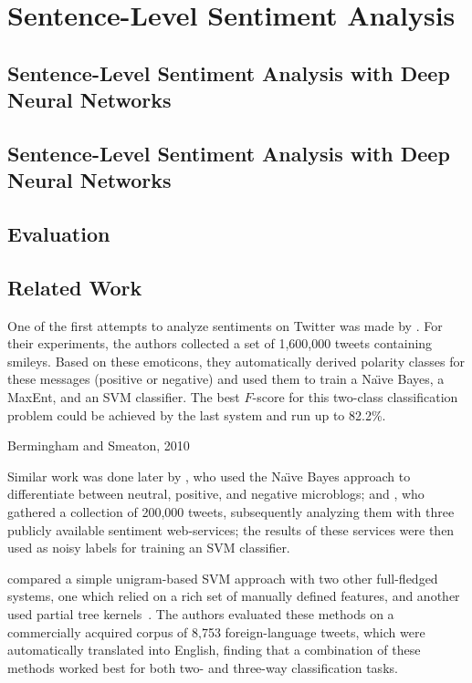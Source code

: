 \section{Sentence-Level Sentiment Analysis}\label{sec:snt:slsa}



\subsection{Sentence-Level Sentiment Analysis with Deep Neural Networks}

\subsection{Sentence-Level Sentiment Analysis with Deep Neural Networks}

\subsection{Evaluation}

\subsection{Related Work}

\citet{Hu:04}

\citet{Kim:04}

One of the first attempts to analyze sentiments on Twitter was made by
\citet{Go:09}.  For their experiments, the authors collected a set of
1,600,000 tweets containing smileys.  Based on these emoticons, they
automatically derived polarity classes for these messages (positive or
negative) and used them to train a Na\"{\i}ve Bayes, a MaxEnt, and an
SVM classifier.  The best $F$-score for this two-class classification
problem could be achieved by the last system and run up to 82.2\%.

Bermingham and Smeaton, 2010

Similar work was done later by \citet{Pak:10}, who used the Na\"{\i}ve
Bayes approach to differentiate between neutral, positive, and
negative microblogs; and \citet{Barbosa:10}, who gathered a collection
of 200,000 tweets, subsequently analyzing them with three publicly
available sentiment web-services; the results of these services were
then used as noisy labels for training an SVM classifier.

\citet{Agarwal:11} compared a simple unigram-based SVM approach with
two other full-fledged systems, one which relied on a rich set of
manually defined features, and another used partial tree
kernels~\cite{Moschitti:06}.  The authors evaluated these methods on a
commercially acquired corpus of 8,753 foreign-language tweets, which
were automatically translated into English, finding that a combination
of these methods worked best for both two- and three-way
classification tasks.

